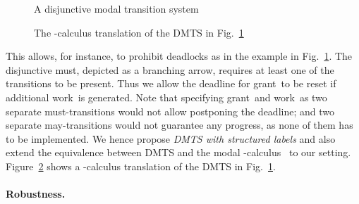 \documentclass[twocolumn]{svjour3-dummy}
\newcommand*\grant{\textsf{grant}}
\newcommand*\work{\textsf{work}}
\begin{document}
\begin{figure}
  \centering
  \caption{\label{fi:quantspecex1}
    A disjunctive modal transition system}
\end{figure}

\begin{figure}\centering
  
  \caption{\label{fi:quantspecex}
    The -calculus translation of the DMTS in
    Fig.~\ref{fi:quantspecex1}}
\end{figure}

This allows, for instance, to prohibit deadlocks as in the example in
Fig.~\ref{fi:quantspecex1}. The disjunctive must, depicted as a
branching arrow, requires at least one of the transitions to be
present. Thus we allow the deadline for \grant\ to be reset if
additional \work\ is generated. Note that specifying \grant\ and
\work\ as two separate must-transitions would not allow postponing the
deadline; and two separate may-transitions would not guarantee any
progress, as none of them has to be implemented. We hence propose
\emph{DMTS with structured labels} and also extend the equivalence
between DMTS and the modal
-calculus~\cite{DBLP:conf/concur/BenesDFKL13,
  DBLP:conf/ictac/FahrenbergLT14} to our setting.
Figure~\ref{fi:quantspecex} shows a -calculus translation of the
DMTS in Fig.~\ref{fi:quantspecex1}.

\paragraph{Robustness.}
\end{document}
